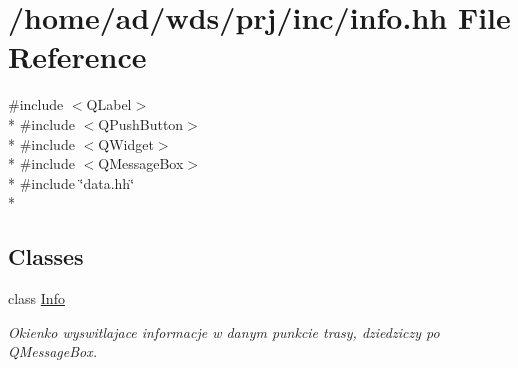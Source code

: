 \hypertarget{info_8hh}{}\section{/home/ad/wds/prj/inc/info.hh File Reference}
\label{info_8hh}
{\ttfamily \#include $<$Q\+Label$>$}\\*
{\ttfamily \#include $<$Q\+Push\+Button$>$}\\*
{\ttfamily \#include $<$Q\+Widget$>$}\\*
{\ttfamily \#include $<$Q\+Message\+Box$>$}\\*
{\ttfamily \#include \char`\"{}data.\+hh\char`\"{}}\\*
\subsection*{Classes}
\begin{DoxyCompactItemize}
\item 
class \hyperlink{class_info}{Info}
\begin{DoxyCompactList}\small\item\em Okienko wyswitlajace informacje w danym punkcie trasy, dziedziczy po Q\+Message\+Box. \end{DoxyCompactList}\end{DoxyCompactItemize}
